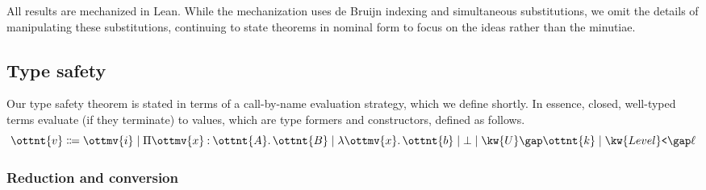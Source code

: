 \documentclass[a4paper,UKenglish,cleveref,autoref,thm-restate]{lipics-v2021}
\begin{document}
All results are mechanized in Lean.
While the mechanization uses de Bruijn indexing and simultaneous substitutions,
we omit the details of manipulating these substitutions,
continuing to state theorems in nominal form
to focus on the ideas rather than the minutiae.

\subsection{Type safety} \label{sec:safety}

Our type safety theorem is stated in terms of a call-by-name evaluation strategy,
which we define shortly.
In essence, closed, well-typed terms evaluate (if they terminate) to values,
which are type formers and constructors,
defined as follows.
$$\ottnt{v} \Coloneqq \ottmv{i} \mid  \Pi  \ottmv{x}  \mathbin{:}  \ottnt{A}  \mathpunct{.}  \ottnt{B}  \mid  \lambda  \ottmv{x}  \mathpunct{.}  \ottnt{b}  \mid  \bot  \mid  \kw{U} \gap  \ottnt{k}  \mid  \kw{Level}\texttt{<} \gap  \ell $$

\subsubsection{Reduction and conversion}
\end{document}
